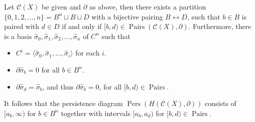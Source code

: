 \begin{theorem}
	{\cite[Theorem 2.6]{de2011dualities}} \label{persistencepartition} Let $\mathcal{C}(X)$ be given and $\partial$ as above, then there
	exists a partition $\{0,1,2, \ldots, n\} = B^{\Join} \sqcup B \sqcup D$ with a bijective pairing $B \leftrightarrow D$, such that $b \in B$ is paired with $d \in D$ if and only if $[b,d) \in \operatorname{Pairs}(\mathcal{C}(X), \partial)$. Furthermore, there is a basis
	$\hat{\sigma}_{0}, \hat{\sigma}_{1}, \hat{\sigma}_{2}, \ldots, \hat{\sigma}_{n}$ of $C^n$ such
	that
	\begin{itemize}
		\item $C^i = \langle \hat{\sigma}_{0}, \hat{\sigma}_{1}, \ldots, \hat{\sigma}_{i} \rangle$ for
			each $i$.
		\item $\partial\hat{\sigma}_{b} = 0$ for all $b \in B^{\Join}$.
		\item $\partial\hat{\sigma}_{d} = \hat{\sigma}_{b}$, and thus
			$\partial\hat{\sigma}_{b} = 0$, for all $[b,d) \in \operatorname{Pairs}$.
	\end{itemize}
	It follows that the persistence diagram
	$\operatorname{Pers}(H(\mathcal{C}(X),\partial))$ consists of $[a_{b}, \infty)$ for
	$b \in B^{\Join}$ together with intervals $[a_{b},a_{d})$ for
	$[b,d) \in \operatorname{Pairs}$.
\end{theorem}

